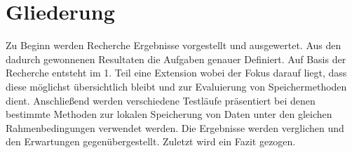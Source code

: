 \section{Gliederung}
\label{s:aufbauderarbeit}

Zu Beginn werden Recherche Ergebnisse vorgestellt und ausgewertet.  Aus den dadurch gewonnenen Resultaten die Aufgaben genauer Definiert. Auf Basis der Recherche entsteht im 1. Teil eine Extension wobei der Fokus darauf liegt, dass diese möglichst übersichtlich bleibt und zur Evaluierung von Speichermethoden dient. Anschließend werden verschiedene Testläufe präsentiert bei denen bestimmte Methoden zur lokalen Speicherung von Daten unter den gleichen Rahmenbedingungen verwendet werden. Die Ergebnisse werden verglichen und den Erwartungen gegenübergestellt. Zuletzt wird ein Fazit gezogen.

















